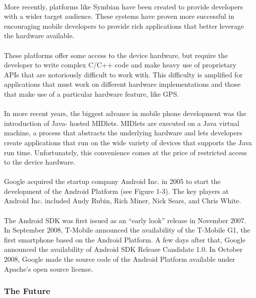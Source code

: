 \documentclass[12pt,a4paper]{report}
\begin{document}
\paragraph{}
More recently, platforms like Symbian have been created to provide developers with a wider target
audience. These systems have proven more successful in encouraging mobile developers to provide rich
applications that better leverage the hardware available.
\paragraph{}
These platforms offer some access to the device hardware, but require the developer to write complex
C/C++ code and make heavy use of proprietary APIs that are notoriously difficult to work with. This
difficulty is amplified for applications that must work on different hardware implementations and those
that make use of a particular hardware feature, like GPS.
\paragraph{}
In more recent years, the biggest advance in mobile phone development was the introduction of Java-
hosted MIDlets. MIDlets are executed on a Java virtual machine, a process that abstracts the underlying
hardware and lets developers create applications that run on the wide variety of devices that supports
the Java run time. Unfortunately, this convenience comes at the price of restricted access to the device
hardware.
\paragraph{}
Google acquired the startup company Android Inc. in 2005 to start the development of the
Android Platform (see Figure 1-3). The key players at Android Inc. included Andy Rubin, Rich
Miner, Nick Sears, and Chris White.
\paragraph{}
The Android SDK was first issued as an “early look” release in November 2007. In September 2008, 
T-Mobile announced the availability of the T-Mobile G1, the first smartphone based
on the Android Platform. A few days after that, Google announced the availability of Android
SDK Release Candidate 1.0. In October 2008, Google made the source code of the Android
Platform available under Apache’s open source license.

\subsubsection{The Future}
\end{document}
